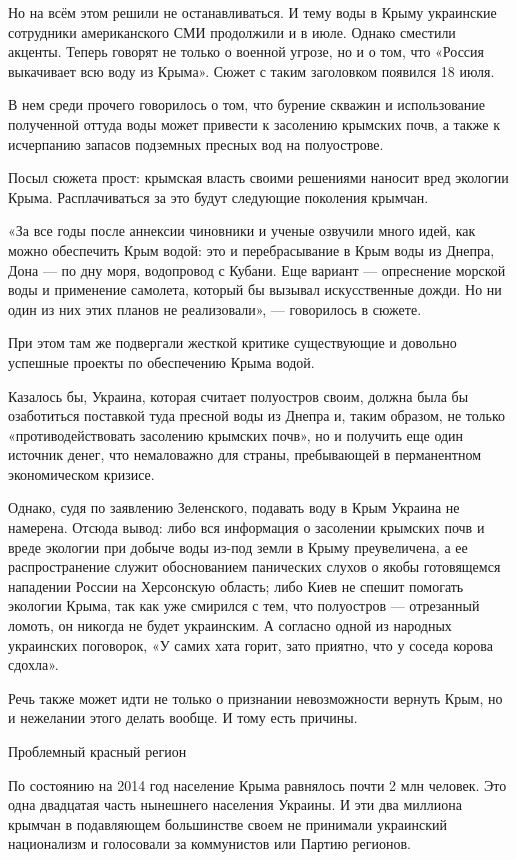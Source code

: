 Но на всём этом решили не останавливаться. И тему воды в Крыму украинские сотрудники американского СМИ продолжили и в июле. Однако сместили акценты. Теперь говорят не только о военной угрозе, но и о том, что «Россия выкачивает всю воду из Крыма». Сюжет с таким заголовком появился 18 июля.

В нем среди прочего говорилось о том, что бурение скважин и использование полученной оттуда воды может привести к засолению крымских почв, а также к исчерпанию запасов подземных пресных вод на полуострове.

Посыл сюжета прост: крымская власть своими решениями наносит вред экологии Крыма. Расплачиваться за это будут следующие поколения крымчан.

«За все годы после аннексии чиновники и ученые озвучили много идей, как можно обеспечить Крым водой: это и перебрасывание в Крым воды из Днепра, Дона --- по дну моря, водопровод с Кубани. Еще вариант --- опреснение морской воды и применение самолета, который бы вызывал искусственные дожди. Но ни один из них этих планов не реализовали», --- говорилось в сюжете.

При этом там же подвергали жесткой критике существующие и довольно успешные проекты по обеспечению Крыма водой.

Казалось бы, Украина, которая считает полуостров своим, должна была бы озаботиться поставкой туда пресной воды из Днепра и, таким образом, не только «противодействовать засолению крымских почв», но и получить еще один источник денег, что немаловажно для страны, пребывающей в перманентном экономическом кризисе.

Однако, судя по заявлению Зеленского, подавать воду в Крым Украина не намерена. Отсюда вывод: либо вся информация о засолении крымских почв и вреде экологии при добыче воды из-под земли в Крыму преувеличена, а ее распространение служит обоснованием панических слухов о якобы готовящемся нападении России на Херсонскую область; либо Киев не спешит помогать экологии Крыма, так как уже смирился с тем, что полуостров --- отрезанный ломоть, он никогда не будет украинским. А согласно одной из народных украинских поговорок, «У самих хата горит, зато приятно, что у соседа корова сдохла».

Речь также может идти не только о признании невозможности вернуть Крым, но и нежелании этого делать вообще. И тому есть причины.

Проблемный красный регион

По состоянию на 2014 год население Крыма равнялось почти 2 млн человек. Это одна двадцатая часть нынешнего населения Украины. И эти два миллиона крымчан в подавляющем большинстве своем не принимали украинский национализм и голосовали за коммунистов или Партию регионов.

